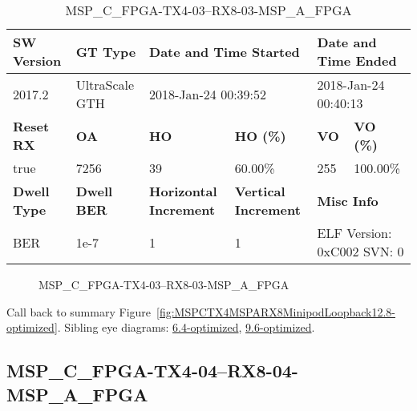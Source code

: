 \begin{table}[h]
\centering
\caption{MSP\_C\_FPGA-TX4-03--RX8-03-MSP\_A\_FPGA}
\label{tab:MSPCFPGATX403RX803MSPAFPGA12.8-optimized}
\begin{tabular}{@{}|l|l|l|l|l|l|@{}}
\toprule
\textbf{SW Version}                & \textbf{GT Type}   & \multicolumn{2}{l|}{\textbf{Date and Time Started}}            & \multicolumn{2}{l|}{\textbf{Date and Time Ended}}        \\ \midrule
2017.2                       & UltraScale GTH          & \multicolumn{2}{l|}{2018-Jan-24 00:39:52}                   & \multicolumn{2}{l|}{2018-Jan-24 00:40:13}               \\ \midrule
\textbf{Reset RX}                  & \textbf{OA} & \textbf{HO}   & \textbf{HO (\%)} & \textbf{VO} & \textbf{VO (\%)} \\ \midrule
true & 7256        & 39          & 60.00\%        & 255        & 100.00\%       \\ \midrule
\textbf{Dwell Type}                & \textbf{Dwell BER} & \textbf{Horizontal Increment} & \textbf{Vertical Increment}    & \multicolumn{2}{l|}{\textbf{Misc Info}}                  \\ \midrule
BER                            & 1e-7        & 1        & 1           & \multicolumn{2}{l|}{ELF Version: 0xC002 SVN: 0}                         \\ \bottomrule
\end{tabular}
\end{table}

\begin{figure}[h]
\caption{MSP\_C\_FPGA-TX4-03--RX8-03-MSP\_A\_FPGA} \label{fig:MSPCFPGATX403RX803MSPAFPGA12.8-optimized}
\end{figure}

Call back to summary Figure~\ref{fig:MSPCTX4MSPARX8MinipodLoopback12.8-optimized}.
Sibling eye diagrams: \hyperref[sec:MSPCFPGATX403RX803MSPAFPGA6.4-optimized]{6.4-optimized}, \hyperref[sec:MSPCFPGATX403RX803MSPAFPGA9.6-optimized]{9.6-optimized}.

\clearpage
\newpage


\subsection{MSP\_C\_FPGA-TX4-04--RX8-04-MSP\_A\_FPGA}\label{sec:MSPCFPGATX404RX804MSPAFPGA12.8-optimized}


